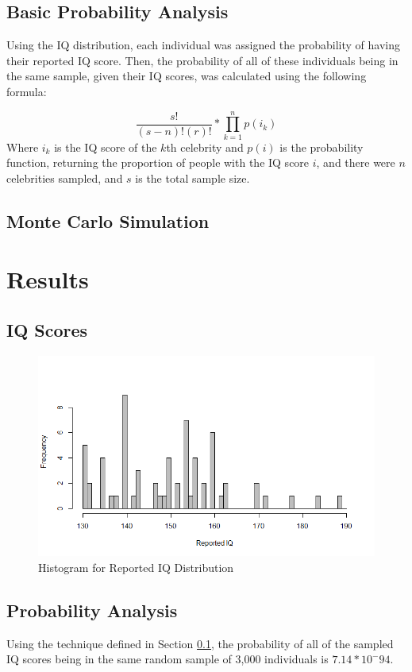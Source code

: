 \documentclass[12pt,letterpaper,titlepage,oneside]{article}
\begin{document}
\subsection{Basic Probability Analysis}
\label{probanal}
Using the IQ distribution, each individual was assigned the probability of having their reported IQ score. Then, the probability of all of these individuals being in the same sample, given their IQ scores, was calculated using the following formula:

\begin{equation}
\frac{s!}{(s-n)!(r)!} * \prod_{k=1}^n p(i_k)
\end{equation}
Where $i_k$ is the IQ score of the $k$th celebrity and $p(i)$ is the probability function, returning the proportion of people with the IQ score $i$, and there were $n$ celebrities sampled, and $s$ is the total sample size.

\subsection{Monte Carlo Simulation} 

\section{Results}
\subsection{IQ Scores}

\begin{figure}[h!]
\caption{Histogram for Reported IQ Distribution}
\label{iqhist}
\includegraphics[scale=.5]{reported-iq}
\end{figure}

\subsection{Probability Analysis}
Using the technique defined in Section \ref{probanal}, the probability of all of the sampled IQ scores being in the same random sample of 3,000 individuals is $7.14*10^-94$.
\end{document}
